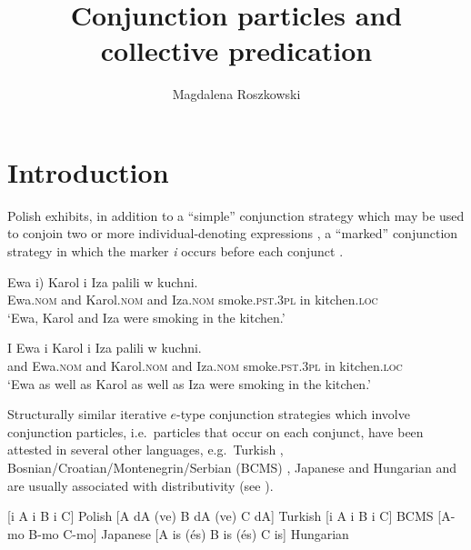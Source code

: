 \documentclass[output=paper]{langscibook}
\author{Magdalena Roszkowski\affiliation{Central European University}}
\title{Conjunction particles and collective predication}
\begin{document}
\maketitle

\section{Introduction}\label{ros:sec:1}


Polish exhibits, in addition to a ``simple'' conjunction strategy which may be used to conjoin two or more individual-denoting expressions , a ``marked'' conjunction strategy in which the marker \textit{i} occurs before each conjunct .

\ea\label{ros:ex1} \gll Ewa \minsp{(} i) Karol i Iza palili w kuchni. \\
Ewa.\textsc{nom} {} and Karol.\textsc{nom} and Iza.\textsc{nom} smoke.\textsc{pst.3pl} in kitchen.\textsc{loc} \\
\glt `Ewa, Karol and Iza were smoking in the kitchen.'
\z 

\ea\label{ros:ex2} \gll I Ewa i Karol i Iza palili w kuchni. \\
and Ewa.\textsc{nom} and Karol.\textsc{nom} and Iza.\textsc{nom} smoke.\textsc{pst.3pl} in kitchen.\textsc{loc} \\
\glt `Ewa as well as Karol as well as Iza were smoking in the kitchen.'
\z 

\noindent Structurally similar iterative $e$-type conjunction strategies which involve conjunction particles, i.e.~particles that occur on each conjunct, have been attested in several other languages, e.g.~Turkish , Bosnian/Croatian/Montenegrin/Serbian (BCMS) , Japanese  and Hungarian  and are usually associated with distributivity (see \citealt{Flor:2017Cross, Mitrovic:2014,Szabolcsi:2015}).

\ea \label{ros:cross}
\ea \label{ros:pl} [i A i B i C]  \hfill Polish
\ex \label{ros:tr} [A dA (ve) B dA (ve) C dA] \hfill Turkish
\ex \label{ros:ser} [i A i B i C] \hfill BCMS
\ex \label{ros:jap} [A-mo B-mo C-mo] \hfill Japanese
\ex \label{ros:hu} [A is (és) B  is (és) C is] \hfill Hungarian
\z\z

\end{document}
